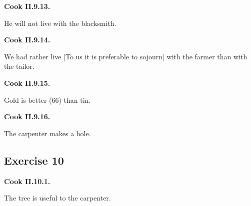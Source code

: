 \par\begin{minipage}{\linewidth}\raggedright
\textbf{Cook II.9.13.}

He will not live with the blacksmith.

\end{minipage}\par\addvspace{4pt}

\par\begin{minipage}{\linewidth}\raggedright
\textbf{Cook II.9.14.}

We had rather live [To us it is preferable to sojourn] with the farmer than with the tailor.

\end{minipage}\par\addvspace{4pt}

\par\begin{minipage}{\linewidth}\raggedright
\textbf{Cook II.9.15.}

Gold is better (66) than tin.

\end{minipage}\par\addvspace{4pt}

\par\begin{minipage}{\linewidth}\raggedright
\textbf{Cook II.9.16.}

The carpenter makes a hole.

\end{minipage}\par\addvspace{4pt}

\subsection*{Exercise 10}

\par\begin{minipage}{\linewidth}\raggedright
\textbf{Cook II.10.1.}

The tree is useful to the carpenter.

\end{minipage}\par\addvspace{4pt}

